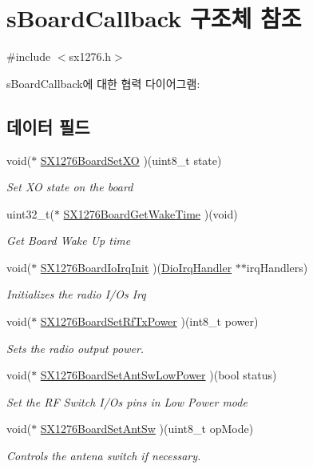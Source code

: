 \hypertarget{structs_board_callback}{}\section{s\+Board\+Callback 구조체 참조}
\label{structs_board_callback}


{\ttfamily \#include $<$sx1276.\+h$>$}



s\+Board\+Callback에 대한 협력 다이어그램\+:
\subsection*{데이터 필드}
\begin{DoxyCompactItemize}
\item 
void($\ast$ \mbox{\hyperlink{structs_board_callback_ad7ed5ef4ab2e13b2839e6df3b1f049a3}{S\+X1276\+Board\+Set\+XO}} )(uint8\+\_\+t state)
\begin{DoxyCompactList}\small\item\em Set XO state on the board \end{DoxyCompactList}\item 
uint32\+\_\+t($\ast$ \mbox{\hyperlink{structs_board_callback_a731a806acb4adddba9464cf0b4b6dd9e}{S\+X1276\+Board\+Get\+Wake\+Time}} )(void)
\begin{DoxyCompactList}\small\item\em Get Board Wake Up time \end{DoxyCompactList}\item 
void($\ast$ \mbox{\hyperlink{structs_board_callback_a400401342a36091fbcf88f1a8ef81db7}{S\+X1276\+Board\+Io\+Irq\+Init}} )(\mbox{\hyperlink{sx1276_8h_af462584f307238535daaea42f6ce791c}{Dio\+Irq\+Handler}} $\ast$$\ast$irq\+Handlers)
\begin{DoxyCompactList}\small\item\em Initializes the radio I/\+Os Irq \end{DoxyCompactList}\item 
void($\ast$ \mbox{\hyperlink{structs_board_callback_aa681fd32fe9ab596fbc60624d0510bb6}{S\+X1276\+Board\+Set\+Rf\+Tx\+Power}} )(int8\+\_\+t power)
\begin{DoxyCompactList}\small\item\em Sets the radio output power. \end{DoxyCompactList}\item 
void($\ast$ \mbox{\hyperlink{structs_board_callback_a05048f8c28130f39b11552ccd1668125}{S\+X1276\+Board\+Set\+Ant\+Sw\+Low\+Power}} )(bool status)
\begin{DoxyCompactList}\small\item\em Set the RF Switch I/\+Os pins in Low Power mode \end{DoxyCompactList}\item 
void($\ast$ \mbox{\hyperlink{structs_board_callback_aff31b16510fde832787af55c87e9d1b7}{S\+X1276\+Board\+Set\+Ant\+Sw}} )(uint8\+\_\+t op\+Mode)
\begin{DoxyCompactList}\small\item\em Controls the antena switch if necessary. \end{DoxyCompactList}\end{DoxyCompactItemize}


